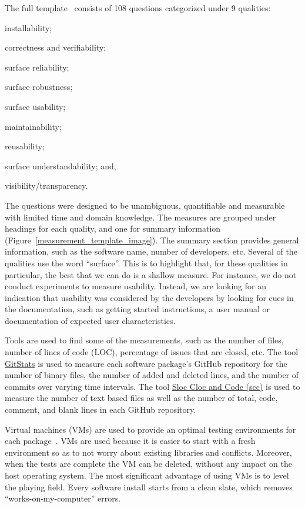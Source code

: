 \documentclass[runningheads]{llncs}
\begin{document}
The full template~\cite{SmithEtAl2021} consists of 108 questions categorized
under 9 qualities:
\begin{inparaenum}[(i)]
	\item installability;
	\item correctness and verifiability;
	\item surface reliability;
	\item surface robustness;
	\item surface usability;
	\item maintainability;
	\item reusability;
	\item surface understandability; and,
	\item visibility/transparency. 
\end{inparaenum} 

The questions were designed to be unambiguous, quantifiable and measurable with
limited time and domain knowledge. The measures are grouped under headings for
each quality, and one for summary information
(Figure~\ref{measurement_template_image}).   The summary section provides
general information, such as the software name, number of developers, etc.
Several of the qualities use the word ``surface''.  This is to highlight that,
for these qualities in particular, the best that we can do is a shallow measure.
For instance, we do not conduct experiments to measure usability. Instead, we
are looking for an indication that usability was considered by the developers by
looking for cues in the documentation, such as getting started instructions, a
user manual or documentation of expected user characteristics.

Tools are used to find some of the measurements, such as the number of files,
number of lines of code (LOC), percentage of issues that are closed, etc. The
tool \href{https://github.com/tomgi/git_stats}{GitStats} is used to measure
each software package's GitHub repository for the number of binary files, the
number of added and deleted lines, and the number of commits over varying time
intervals. The tool \href{https://github.com/boyter/scc}{Sloc Cloc and Code
(scc)} is used to measure the number of text based files as well as the number
of total, code, comment, and blank lines in each GitHub repository.

Virtual machines (VMs) are used to provide an optimal testing environments for
each package~\cite{SmithEtAl2016}. VMs are used because it is easier to start
with a fresh environment so as to not worry about existing libraries and
conflicts. Moreover, when the tests are complete the VM can be deleted, without
any impact on the host operating system. The most significant advantage of using
VMs is to level the playing field. Every software install starts from a clean
slate, which removes ``works-on-my-computer'' errors.
\end{document}
